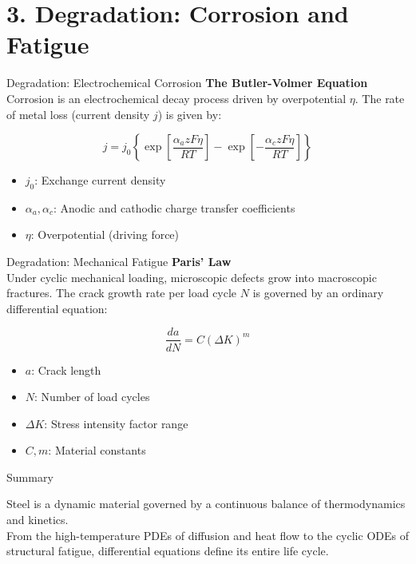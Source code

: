 \documentclass{beamer}
\begin{document}
\section{3. Degradation: Corrosion and Fatigue}

\begin{frame}{Degradation: Electrochemical Corrosion}
    \textbf{The Butler-Volmer Equation} \\
    Corrosion is an electrochemical decay process driven by overpotential $\eta$. The rate of metal loss (current density $j$) is given by:

    $$j = j_0 \left\{ \exp \left[ \frac{\alpha_a z F \eta}{RT} \right] - \exp \left[ -\frac{\alpha_c z F \eta}{RT} \right] \right\}$$

    \begin{itemize}
        \item $j_0$: Exchange current density
        \item $\alpha_a, \alpha_c$: Anodic and cathodic charge transfer coefficients
        \item $\eta$: Overpotential (driving force)
    \end{itemize}
\end{frame}

\begin{frame}{Degradation: Mechanical Fatigue}
    \textbf{Paris' Law} \\
    Under cyclic mechanical loading, microscopic defects grow into macroscopic fractures. The crack growth rate per load cycle $N$ is governed by an ordinary differential equation:

    $$\frac{da}{dN} = C(\Delta K)^m$$

    \begin{itemize}
        \item $a$: Crack length
        \item $N$: Number of load cycles
        \item $\Delta K$: Stress intensity factor range
        \item $C, m$: Material constants
    \end{itemize}
\end{frame}

\begin{frame}{Summary}
    \begin{center}
        \Large Steel is a dynamic material governed by a continuous balance of thermodynamics and kinetics. \\
        \vspace{1cm}
        From the high-temperature PDEs of diffusion and heat flow to the cyclic ODEs of structural fatigue, differential equations define its entire life cycle.
    \end{center}
\end{frame}
\end{document}
